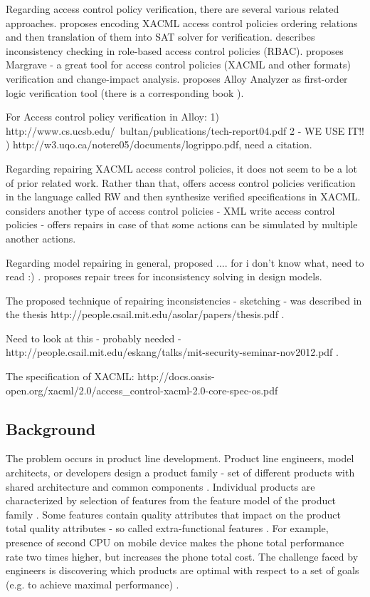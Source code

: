 \documentclass{acm_proc_article-sp}
\begin{document}
Regarding access control policy verification, there are several various related approaches.
\cite{Hughes:2008:AVA:1459278.1459282} proposes encoding XACML access control policies  ordering relations and then translation of them into SAT solver for verification. \cite{4258517} describes inconsistency checking in role-based access control policies (RBAC).  \cite{Fisler:2005:VCA:1062455.1062502} proposes Margrave - a great tool for access control policies (XACML and other formats) verification and change-impact analysis. \cite{Jackson:2000:AFR:357474.355063} proposes Alloy Analyzer as first-order logic verification tool (there is a corresponding book \cite{jackson:alloy}).

For Access control policy verification in Alloy: 
1) http://www.cs.ucsb.edu/~bultan/publications/tech-report04.pdf
2 - WE USE IT!! ) http://w3.uqo.ca/notere05/documents/logrippo.pdf, need a citation.

Regarding repairing XACML access control policies, it does not seem to be a lot of prior related work. Rather than that, \cite{Zhang:2004:SVA:1029133.1029141} offers access control policies verification in the language called RW and then synthesize verified specifications in XACML. \cite{Bravo:2007:RIX:1783534.1783545} considers another type of access control policies - XML write access control policies - offers repairs in case of that some actions can be simulated by multiple another actions. 

Regarding model repairing in general, \cite{Xiong:2009:SAM:1595696.1595757} proposed .... for i don't know what, need to read :) . \cite{Reder:2012:CRT:2351676.2351707} proposes repair trees for inconsistency solving in design models.

The proposed technique of repairing inconsistencies - sketching - was described in the thesis http://people.csail.mit.edu/asolar/papers/thesis.pdf .

Need to look at this - probably needed - http://people.csail.mit.edu/eskang/talks/mit-security-seminar-nov2012.pdf .

The specification of XACML:
http://docs.oasis-open.org/xacml/2.0/access_control-xacml-2.0-core-spec-os.pdf


\subsection{Background}

The problem occurs in product line development. Product line engineers, model architects, or developers design a product family - set of different products with shared architecture and common components \cite{ClementsNorthrop2001}. Individual products are characterized by selection of features from the feature model of the product family \cite{Kang90}. Some features contain quality attributes that impact on the product total quality attributes - so called extra-functional features \cite{Benavides05automatedreasoning}. For example, presence of second CPU on mobile device makes the phone total performance rate two times higher, but increases the phone total cost. The challenge faced by engineers is discovering which products are optimal with respect to a set of goals (e.g. to achieve maximal performance) \cite{474}.
\end{document}
